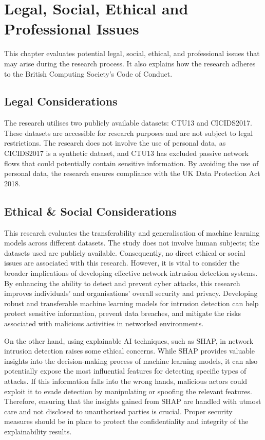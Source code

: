 \chapter{Legal, Social, Ethical and Professional Issues}\label{chap:professional-issues}

This chapter evaluates potential legal, social, ethical, and professional issues that may arise during the research process. It also explains how the research adheres to the British Computing Society's Code of Conduct.

\section{Legal Considerations}
The research utilises two publicly available datasets: CTU13\cite{garcia2014empirical} and CICIDS2017\cite{sharafaldin2018toward}. These datasets are accessible for research purposes and are not subject to legal restrictions. The research does not involve the use of personal data, as CICIDS2017 is a synthetic dataset, and CTU13 has excluded passive network flows that could potentially contain sensitive information. By avoiding the use of personal data, the research ensures compliance with the UK Data Protection Act 2018.

\section{Ethical \& Social Considerations}
This research evaluates the transferability and generalisation of machine learning models across different datasets. The study does not involve human subjects; the datasets used are publicly available. Consequently, no direct ethical or social issues are associated with this research. However, it is vital to consider the broader implications of developing effective network intrusion detection systems. By enhancing the ability to detect and prevent cyber attacks, this research improves individuals' and organisations' overall security and privacy. Developing robust and transferable machine learning models for intrusion detection can help protect sensitive information, prevent data breaches, and mitigate the risks associated with malicious activities in networked environments.

On the other hand, using explainable AI techniques, such as SHAP, in network intrusion detection raises some ethical concerns. While SHAP provides valuable insights into the decision-making process of machine learning models, it can also potentially expose the most influential features for detecting specific types of attacks. If this information falls into the wrong hands, malicious actors could exploit it to evade detection by manipulating or spoofing the relevant features. Therefore, ensuring that the insights gained from SHAP are handled with utmost care and not disclosed to unauthorised parties is crucial. Proper security measures should be in place to protect the confidentiality and integrity of the explainability results.


